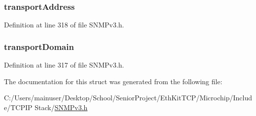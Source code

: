 \subsubsection[{transport\+Address}]{ transport\+Address}\label{struct_msg_proc_mod_prepare_outgoing_message_a4943d5b448452380d516089d6a59700c}


Definition at line 318 of file S\+N\+M\+Pv3.\+h.

\hypertarget{struct_msg_proc_mod_prepare_outgoing_message_a9caa74f4cfb6917bbf209d8f1de38a9f}{}
\subsubsection[{transport\+Domain}]{ transport\+Domain}\label{struct_msg_proc_mod_prepare_outgoing_message_a9caa74f4cfb6917bbf209d8f1de38a9f}


Definition at line 317 of file S\+N\+M\+Pv3.\+h.



The documentation for this struct was generated from the following file\+:\begin{DoxyCompactItemize}
\item 
C\+:/\+Users/mainuser/\+Desktop/\+School/\+Senior\+Project/\+Eth\+Kit\+T\+C\+P/\+Microchip/\+Include/\+T\+C\+P\+I\+P Stack/\hyperlink{_s_n_m_pv3_8h}{S\+N\+M\+Pv3.\+h}\end{DoxyCompactItemize}
